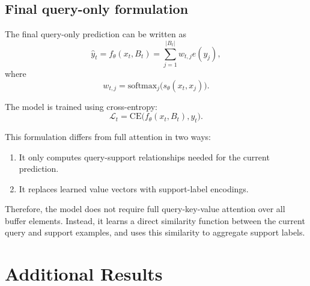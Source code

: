 \documentclass{article}
\begin{document}
\subsection{Final query-only formulation}

The final query-only prediction can be written as
\begin{equation}
\hat{y}_t
=
f_\theta(x_t,B_t)
=
\sum_{j=1}^{|B_t|}
w_{t,j} e(y_j),
\end{equation}
where
\begin{equation}
w_{t,j}
=
\mathrm{softmax}_j\big(s_\theta(x_t,x_j)\big).
\end{equation}

The model is trained using cross-entropy:
\begin{equation}
\mathcal{L}_t
=
\mathrm{CE}\big(f_\theta(x_t,B_t), y_t\big).
\end{equation}

This formulation differs from full attention in two ways:

\begin{enumerate}
    \item It only computes query-support relationships needed for the current prediction.
    \item It replaces learned value vectors with support-label encodings.
\end{enumerate}

Therefore, the model does not require full query-key-value attention over all buffer elements. Instead, it learns a direct similarity function between the current query and support examples, and uses this similarity to aggregate support labels.
\clearpage
\appendix
\section{Additional Results}
\label{sec:additional_results}
\end{document}
